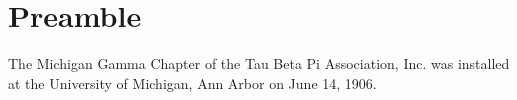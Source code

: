 \documentclass[constitution,final,withoutpreface,withoutoptional,11pt]{../bylaws}
\begin{document}
\newenvironment{tight_enumerate}{
  \vspace{2mm}
\begin{compactenum}[1.]
  \setlength{\itemindent}{+1.20em}
  \setlength{\itemsep}{5pt}
  \setlength{\parskip}{2pt}
}{\end{compactenum}
  \vspace{3mm}
}


\frontmatter
\maketitle
\setcounter{tocdepth}{0}
\tableofcontents
\newpage
\mainmatter
\chapter*{Preamble}
The Michigan Gamma Chapter of the Tau Beta Pi Association, Inc. was installed at the University of Michigan, Ann Arbor on June 14, 1906. 








\end{document}
